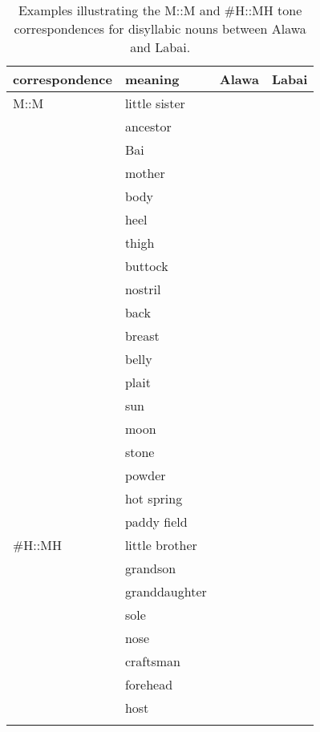 \begin{table}%
\caption{Examples illustrating the M::M and \#H::MH tone correspondences for disyllabic nouns between Alawa and Labai.}
\begin{tabularx}{\textwidth}{ l Q@{\hspace{8mm}} Q Q }
  \lsptoprule
	{correspondence} & meaning & Alawa & Labai\\ \midrule
	M::M & little sister &  & \\
	& ancestor &  & \\
	& Bai &  & \\
	& mother &  & \\
	& body &  & \\
	& heel &  & \\
	& thigh &  & \\
	& buttock &  & \\
	& nostril &  & \\
	& back &  & \\
	& breast &  & \\
	& belly &  & \\
	& plait &  & \\
	& sun &  & \\
	& moon &  & \\
	& stone &  & \\
	& powder &  & \\
	& hot spring &  & \\
	& paddy field &  & \\ \midrule
	\#H::MH & little brother &  & \\
	& grandson &  & \\
	& granddaughter &  & \\
	& sole &  & \\
	& nose &  & \\
	& craftsman &  & \\
	& forehead &  & \\
	& host &  & \\
\lspbottomrule
\end{tabularx}
\label{tab:mmandhmhtonecorrespondences}
\end{table}

